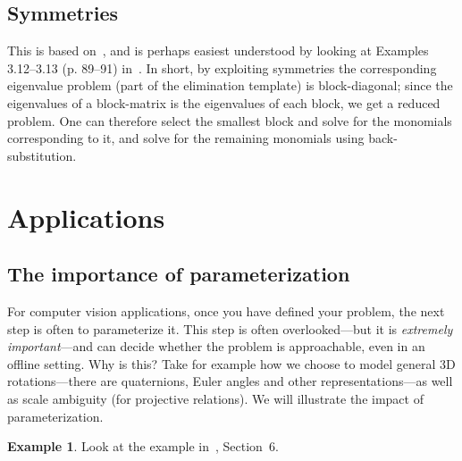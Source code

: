 \documentclass[11pt,a4paper]{article}
\theoremstyle{definition}
\newtheorem{example}{Example}
\begin{document}
\subsection{Symmetries}
This is based on~\cite{larsson2016eccv}, and is perhaps easiest understood by looking
at Examples 3.12--3.13 (p. 89--91) in~\cite{larsson-phd}.
In short, by exploiting symmetries the corresponding eigenvalue problem (part of the
elimination template) is block-diagonal; since the eigenvalues of a block-matrix is
the eigenvalues of each block, we get a reduced problem. One can therefore select the smallest
block and solve for the monomials corresponding to it, and solve for the remaining monomials
using back-substitution.

\section{Applications}
\subsection{The importance of parameterization}
For computer vision applications, once you have defined your problem, the next step is often to
parameterize it. This step is often overlooked---but it is \emph{extremely important}---and can
decide whether the problem is approachable, even in an offline setting. Why is this? Take
for example how we choose to model general 3D rotations---there are quaternions, Euler angles
and other representations---as well as scale ambiguity (for projective relations).
We will illustrate the impact of
parameterization.

\begin{example}
Look at the example in~\cite{larsson2017cvpr}, Section~6.
\end{example}
\end{document}
